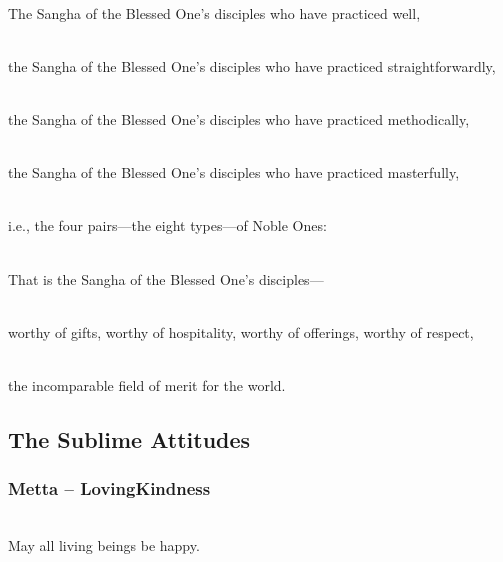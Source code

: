 \documentclass[letterpaper,10pt,english]{sphinxmanual}
\begin{document}
\sphinxAtStartPar
{} \\
The Sangha of the Blessed One’s disciples who have practiced well,

\sphinxAtStartPar
{} \\
the Sangha of the Blessed One’s disciples who have practiced
straightforwardly,

\sphinxAtStartPar
{} \\
the Sangha of the Blessed One’s disciples who have practiced
methodically,

\sphinxAtStartPar
{} \\
the Sangha of the Blessed One’s disciples who have practiced masterfully,

\sphinxAtStartPar
{} \\
i.e., the four pairs—the eight types—of Noble Ones:

\sphinxAtStartPar
{} \\
That is the Sangha of the Blessed One’s disciples—

\sphinxAtStartPar
{} \\
worthy of gifts, worthy of hospitality, worthy of offerings, worthy of respect,

\sphinxAtStartPar
{} \\
the incomparable field of merit for the world.


\subsection{The Sublime Attitudes}
\label{\detokenize{chanting:the-sublime-attitudes}}

\subsubsection{Metta – Loving\sphinxhyphen{}Kindness}
\label{\detokenize{chanting:metta-loving-kindness}}
\sphinxAtStartPar
{}  \\
May all living beings be happy.
\end{document}
